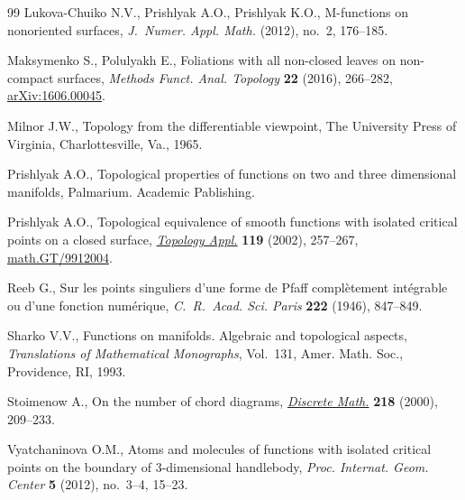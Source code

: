 \documentclass[pdftex]{sigma}
\numberwithin{equation}{section}
\begin{document}
\begin{thebibliography}{99}
Lukova-Chuiko N.V., Prishlyak A.O., Prishlyak K.O., M-functions on nonoriented
 surfaces, \textit{J.~Numer. Appl. Math.} (2012), no.~2, 176--185.

Maksymenko S., Polulyakh E., Foliations with all non-closed leaves on
 non-compact surfaces, \textit{Methods Funct. Anal. Topology} \textbf{22}
 (2016), 266--282, \href{https://arxiv.org/abs/1606.00045}{arXiv:1606.00045}.

Milnor J.W., Topology from the dif\/ferentiable viewpoint, The University Press
 of Virginia, Charlottesville, Va., 1965.

Prishlyak A.O., Topological properties of functions on two and three
 dimensional manifolds, Palmarium. Academic Pablishing.

Prishlyak A.O., Topological equivalence of smooth functions with isolated
 critical points on a closed surface, \href{https://doi.org/10.1016/S0166-8641(01)00077-3}{\textit{Topology Appl.}} \textbf{119}
 (2002), 257--267, \href{https://arxiv.org/abs/math.GT/9912004}{math.GT/9912004}.

Reeb G., Sur les points singuliers d'une forme de {P}faf\/f compl\`etement
 int\'egrable ou d'une fonction num\'erique, \textit{C.~R.~Acad. Sci. Paris}
 \textbf{222} (1946), 847--849.

Sharko V.V., Functions on manifolds. Algebraic and topological aspects,
 \textit{Translations of Mathematical Monographs}, Vol.~131, Amer. Math. Soc.,
 Providence, RI, 1993.

Stoimenow A., On the number of chord diagrams, \href{https://doi.org/10.1016/S0012-365X(99)00347-7}{\textit{Discrete Math.}}
 \textbf{218} (2000), 209--233.

Vyatchaninova O.M., Atoms and molecules of functions with isolated critical
 points on the boundary of 3-dimensional handlebody, \textit{Proc. Internat.
 Geom. Center} \textbf{5} (2012), no.~3--4, 15--23.

\end{thebibliography}\LastPageEnding
\end{document}

